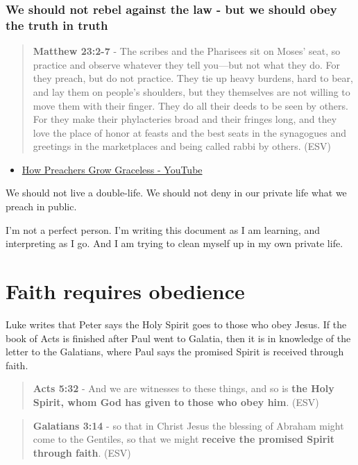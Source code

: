 \documentclass[11pt]{article}
\begin{document}
\subsubsection{We should not rebel against the law - but we should obey the truth in truth}
\label{sec:orgcbad903}
\begin{quote}
\textbf{Matthew 23:2-7} - The scribes and the Pharisees sit on Moses' seat, so practice and observe whatever they tell you—but not what they do. For they preach, but do not practice. They tie up heavy burdens, hard to bear, and lay them on people's shoulders, but they themselves are not willing to move them with their finger. They do all their deeds to be seen by others. For they make their phylacteries broad and their fringes long, and they love the place of honor at feasts and the best seats in the synagogues and greetings in the marketplaces and being called rabbi by others. (ESV)
\end{quote}

\begin{itemize}
\item \href{https://www.youtube.com/watch?v=alOI2zxIPgc}{How Preachers Grow Graceless - YouTube}
\end{itemize}

We should not live a double-life.
We should not deny in our private life what we preach in public.

I'm not a perfect person. I'm writing this document as I am learning, and interpreting as I go.
And I am trying to clean myself up in my own private life.

\section{Faith requires obedience}
\label{sec:org3a7705c}
Luke writes that Peter says the Holy Spirit goes to those who obey Jesus.
If the book of Acts is finished after Paul went to Galatia, then it is in knowledge of the letter to the Galatians, where Paul says the promised Spirit is received through faith.

\begin{quote}
\textbf{Acts 5:32} - And we are witnesses to these things, and so is \textbf{the Holy Spirit, whom God has given to those who obey him}. (ESV)
\end{quote}

\begin{quote}
\textbf{Galatians 3:14} - so that in Christ Jesus the blessing of Abraham might come to the Gentiles, so that we might \textbf{receive the promised Spirit through faith}. (ESV)
\end{quote}
\end{document}
